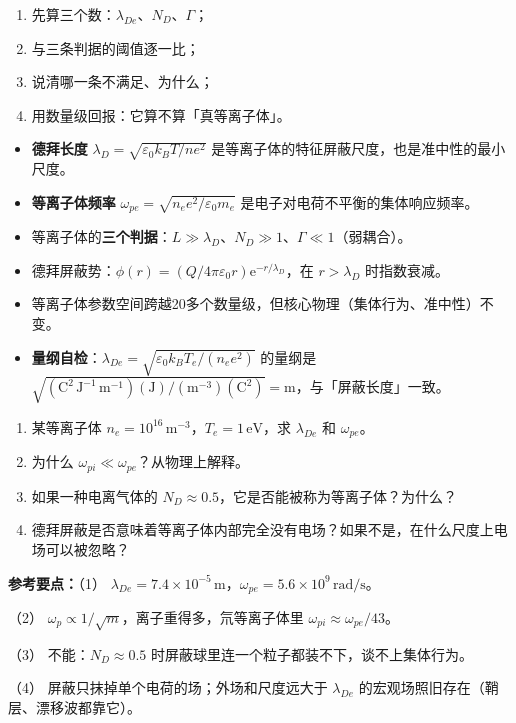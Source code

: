 \documentclass[12pt,a4paper,openany,oneside]{book}
\newcommand{\quizans}[1]{\par\medskip{\color{figGray}\rule{\linewidth}{0.3pt}}\par\smallskip
  {\footnotesize\textbf{参考要点：}#1}}
\newcommand{\ee}{\mathrm{e}}
\newcommand{\eps}{\varepsilon}
\begin{document}
\begin{strategy}
\small
\begin{enumerate}[leftmargin=1.4em,itemsep=1pt,topsep=2pt]
\item 先算三个数：$\lambda_{De}$、$N_D$、$\Gamma$；
\item 与三条判据的阈值逐一比；
\item 说清哪一条不满足、为什么；
\item 用数量级回报：它算不算「真等离子体」。
\end{enumerate}
\end{strategy}

\begin{chapterreview}
\begin{itemize}
\item \textbf{德拜长度} $\lambda_D = \sqrt{\eps_0 k_BT/ne^2}$ 是等离子体的特征屏蔽尺度，也是准中性的最小尺度。
\item \textbf{等离子体频率} $\omega_{pe} = \sqrt{n_e e^2/\eps_0 m_e}$ 是电子对电荷不平衡的集体响应频率。
\item 等离子体的\textbf{三个判据}：$L \gg \lambda_D$、$N_D \gg 1$、$\Gamma \ll 1$（弱耦合）。
\item 德拜屏蔽势：$\phi(r) = (Q/4\pi\eps_0 r)\ee^{-r/\lambda_D}$，在 $r>\lambda_D$ 时指数衰减。
\item 等离子体参数空间跨越20多个数量级，但核心物理（集体行为、准中性）不变。
\item \textbf{量纲自检}：$\lambda_{De}=\sqrt{\varepsilon_0k_BT_e/(n_ee^2)}$ 的量纲是 $\sqrt{(\mathrm{C^2\,J^{-1}\,m^{-1}})(\mathrm J)/(\mathrm{m^{-3}})(\mathrm{C^2})}=\mathrm m$，与「屏蔽长度」一致。
\end{itemize}
\end{chapterreview}

\begin{miniquiz}
\begin{enumerate}
\item 某等离子体 $n_e = 10^{16}\,\mathrm{m}^{-3}$，$T_e = 1\,\mathrm{eV}$，求 $\lambda_{De}$ 和 $\omega_{pe}$。
\item 为什么 $\omega_{pi} \ll \omega_{pe}$？从物理上解释。
\item 如果一种电离气体的 $N_D \approx 0.5$，它是否能被称为等离子体？为什么？
\item 德拜屏蔽是否意味着等离子体内部完全没有电场？如果不是，在什么尺度上电场可以被忽略？
\end{enumerate}
\quizans{（1） $\lambda_{De}=7.4\times10^{-5}\,\mathrm{m}$，$\omega_{pe}=5.6\times10^{9}\,\mathrm{rad/s}$。\par （2） $\omega_p\propto1/\sqrt m$，离子重得多，氘等离子体里 $\omega_{pi}\approx\omega_{pe}/43$。\par （3） 不能：$N_D\approx0.5$ 时屏蔽球里连一个粒子都装不下，谈不上集体行为。\par （4） 屏蔽只抹掉单个电荷的场；外场和尺度远大于 $\lambda_{De}$ 的宏观场照旧存在（鞘层、漂移波都靠它）。}
\end{miniquiz}
\end{document}
